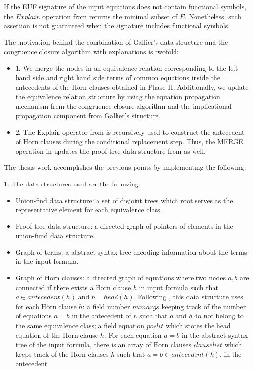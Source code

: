 If the EUF signature of the input 
equations does not contain functional symbols, 
the $Explain$ operation from \cite{10.1007/978-3-540-32033-3_33} 
returns the minimal subset of $E$. Nonetheless, such
assertion is not guaranteed when the signature
includes functional symbols.

The motivation behind the combination of 
Gallier's data structure and the congruence 
closure algorithm with explanations is twofold: 

\begin{itemize}
  \item[] 1. We merge the nodes 
    in an equivalence
    relation corresponding to the left hand side 
    and right hand side terms of
    common equations inside the antecedents of 
    the Horn clauses obtained in Phase II.
    Additionally, we update the equivalence relation 
    structure by using the equation propagation mechanism
    from the congruence closure algorithm and 
    the implicational propagation component 
    from Gallier's structure.
  \item[] 2. The Explain operator from
    \cite{10.1007/978-3-540-32033-3_33} is recursively 
    used to construct the antecedent of Horn clauses during the 
    conditional replacement step. 
    Thus, the MERGE operation in \cite{GALLIER1987233}
    updates the proof-tree data structure
    from \cite{10.1007/978-3-540-32033-3_33} as well.
\end{itemize}

The thesis work accomplishes the previous
points by implementing the following:

1. The data structures used are
the following:

\begin{itemize}
  \item Union-find data structure: a set of disjoint
    trees which root serves as the representative 
    element for each equivalence class.
  \item Proof-tree data structure: a directed graph of pointers
    of elements in the union-fund data structure.
  \item Graph of terms: a abstract syntax tree encoding
    information about the terms in the input formula.
  \item Graph of Horn clauses: a directed graph of equations
    where two nodes $a, b$ are connected if there
    exists a Horn clause $h$ in input formula such that 
    $a \in antecedent(h)$ and $b = head(h)$. Following
    \cite{GALLIER1987233}, this data structure uses
    for each Horn clause $h$: a field number $numargs$ keeping 
    track of the number of equations $a = b$ in the antecedent of $h$
    such that $a$ and $b$ do not belong to the same 
    equivalence class; a field equation $poslit$ which stores
    the head equation of the Horn clause $h$.
    For each equation $a = b$ in the abstract syntax tree of the 
    input formula, there is an array of Horn clauses $clauselist$ 
    which keeps track of the Horn clauses $h$ such that
    $a = b \in antecedent(h)$.
    in the antecedent 

\end{itemize}

